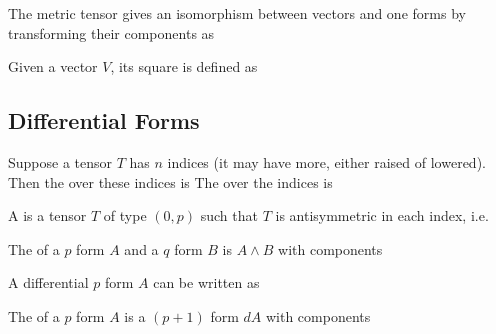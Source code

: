 \documentclass{article}
\begin{document}
\begin{lemma}
The metric tensor gives an isomorphism between vectors and one forms by transforming their components as 
\end{lemma}

\begin{definition}
Given a vector $V$, its square is defined as 
\end{definition}


\subsection{Differential Forms}

\begin{definition}[Symmetrisation]
Suppose a tensor $T$ has $n$ indices (it may have more, either raised of lowered). Then the  over these indices is 
The  over the indices is 
\end{definition}

\begin{definition}
A  is a tensor $T$ of type $(0,p)$ such that $T$ is antisymmetric in each index, i.e. 
\end{definition}

\begin{definition}
The  of a $p$ form $A$ and a $q$ form $B$ is $A \wedge B$ with components 
\end{definition}

\begin{lemma}
\end{lemma}

\begin{lemma}
A differential $p$ form $A$ can be written as 
\end{lemma}

\begin{definition}
The  of a $p$ form $A$ is a $(p+1)$ form $dA$ with components 
\end{definition}
\end{document}
